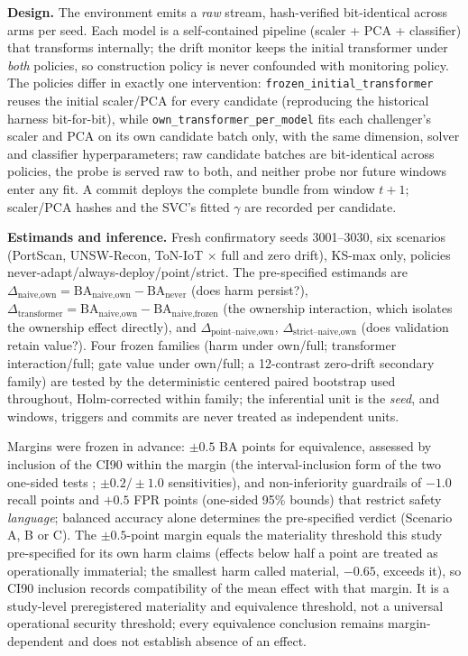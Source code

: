 \documentclass[a4paper,fleqn]{cas-sc}
\begin{document}
\textbf{Design.} The environment emits a \emph{raw} stream, hash-verified bit-identical across arms per seed. Each model is a self-contained pipeline (scaler + PCA + classifier) that transforms internally; the drift monitor keeps the initial transformer under \emph{both} policies, so construction policy is never confounded with monitoring policy. The policies differ in exactly one intervention: \texttt{frozen\_initial\_transformer} reuses the initial scaler/PCA for every candidate (reproducing the historical harness bit-for-bit), while \texttt{own\_transformer\_per\_model} fits each challenger's scaler and PCA on its own candidate batch only, with the same dimension, solver and classifier hyperparameters; raw candidate batches are bit-identical across policies, the probe is served raw to both, and neither probe nor future windows enter any fit. A commit deploys the complete bundle from window $t{+}1$; scaler/PCA hashes and the SVC's fitted $\gamma$ are recorded per candidate.

\textbf{Estimands and inference.} Fresh confirmatory seeds 3001--3030, six scenarios (PortScan, UNSW-Recon, ToN-IoT $\times$ full and zero drift), KS-max only, policies never-adapt/always-deploy/point/strict. The pre-specified estimands are $\Delta_{\text{naive,own}} = \mathrm{BA}_{\text{naive,own}} - \mathrm{BA}_{\text{never}}$ (does harm persist?), $\Delta_{\text{transformer}} = \mathrm{BA}_{\text{naive,own}} - \mathrm{BA}_{\text{naive,frozen}}$ (the ownership interaction, which isolates the ownership effect directly), and $\Delta_{\text{point--naive,own}}$, $\Delta_{\text{strict--naive,own}}$ (does validation retain value?). Four frozen families (harm under own/full; transformer interaction/full; gate value under own/full; a 12-contrast zero-drift secondary family) are tested by the deterministic centered paired bootstrap used throughout, Holm-corrected within family; the inferential unit is the \emph{seed}, and windows, triggers and commits are never treated as independent units.

Margins were frozen in advance: $\pm0.5$ BA points for equivalence, assessed by inclusion of the CI90 within the margin (the interval-inclusion form of the two one-sided tests \cite{schuirmann1987comparison}; $\pm0.2/\pm1.0$ sensitivities), and non-inferiority guardrails of $-1.0$ recall points and $+0.5$ FPR points (one-sided 95\% bounds) that restrict safety \emph{language}; balanced accuracy alone determines the pre-specified verdict (Scenario A, B or C). The $\pm0.5$-point margin equals the materiality threshold this study pre-specified for its own harm claims (effects below half a point are treated as operationally immaterial; the smallest harm called material, $-0.65$, exceeds it), so CI90 inclusion records compatibility of the mean effect with that margin. It is a study-level preregistered materiality and equivalence threshold, not a universal operational security threshold; every equivalence conclusion remains margin-dependent and does not establish absence of an effect.
\end{document}
